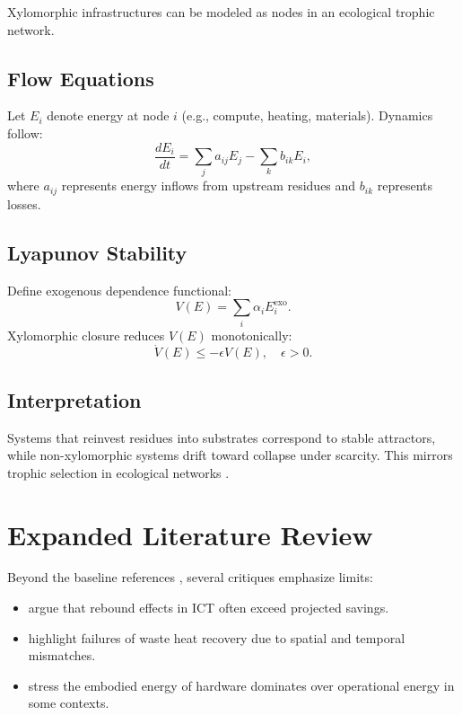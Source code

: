 \documentclass[12pt]{article}
\theoremstyle{plain}
\begin{document}
{{{{{{{{{{{{{{{{Xylomorphic infrastructures can be modeled as nodes in an ecological trophic network.

\subsection{Flow Equations}

Let $E_i$ denote energy at node $i$ (e.g., compute, heating, materials). Dynamics follow:
\[
\frac{dE_i}{dt} = \sum_{j} a_{ij} E_j - \sum_{k} b_{ik} E_i,
\]
where $a_{ij}$ represents energy inflows from upstream residues and $b_{ik}$ represents losses.

\subsection{Lyapunov Stability}

Define exogenous dependence functional:
\[
V(E) = \sum_i \alpha_i E_i^{\text{exo}}.
\]
Xylomorphic closure reduces $V(E)$ monotonically:
\[
\dot{V}(E) \leq -\epsilon V(E), \quad \epsilon > 0.
\]

\subsection{Interpretation}

Systems that reinvest residues into substrates correspond to stable attractors, while non-xylomorphic systems drift toward collapse under scarcity. This mirrors trophic selection in ecological networks \citep{Odum1994, DalyFarley2011}.

\section{Expanded Literature Review}
\label{sec:literature-review-expanded}

Beyond the baseline references \citep{Strubell2019, Koomey2011, Sorrell2009}, several critiques emphasize limits:

\begin{itemize}
    \item \citet{Masanet2020} argue that rebound effects in ICT often exceed projected savings.
    \item \citet{Jones2021} highlight failures of waste heat recovery due to spatial and temporal mismatches.
    \item \citet{Horner2014} stress the embodied energy of hardware dominates over operational energy in some contexts.
\end{itemize}

}}}}}}}}}}}}}}}}
\end{document}
